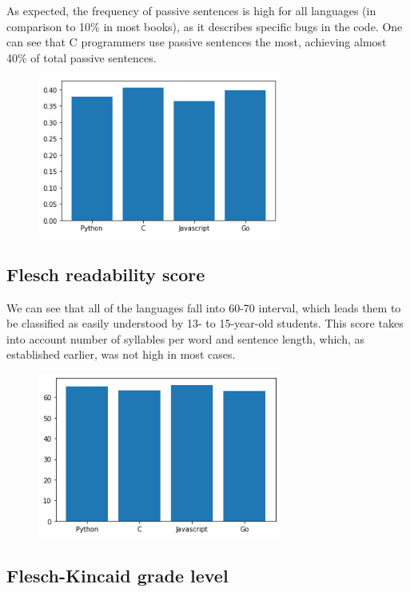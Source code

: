\documentclass[]{article}
\begin{document}
As expected, the frequency of passive sentences is high for all languages (in comparison to 10\% in most books), as it describes specific bugs in the code. One can see that C programmers use passive sentences the most, achieving almost 40\% of total passive sentences.

                                \begin{figure}[H]
    \includegraphics[width=8cm]{resources/passives.png}
    \centering
    \end{figure}
    
\subsection{Flesch readability score}

We can see that all of the languages fall into 60-70 interval, which leads them to be classified as easily understood by 13- to 15-year-old students. This score takes into account number of syllables per word and sentence length, which, as established earlier, was not high in most cases.

    \begin{figure}[H]
    \includegraphics[width=8cm]{resources/flesch.png}
    \centering
    \end{figure}
    
\subsection{Flesch-Kincaid grade level}
\end{document}
